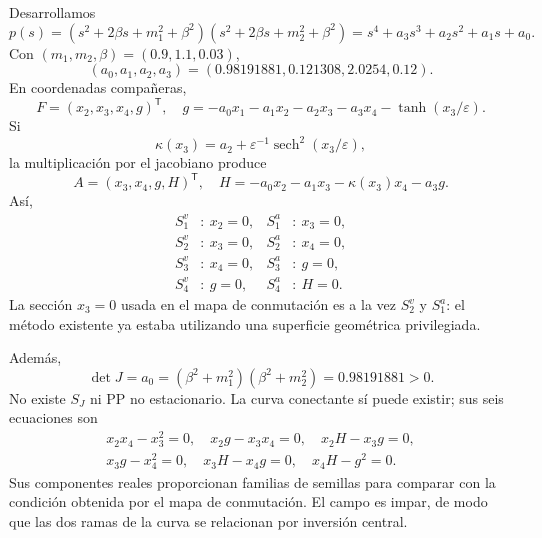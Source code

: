 Desarrollamos
\begin{equation}
 p(s)=(s^2+2\beta s+m_1^2+\beta^2)
       (s^2+2\beta s+m_2^2+\beta^2)
 =s^4+a_3s^3+a_2s^2+a_1s+a_0.
 \label{casegt:eq:kalman-poly}
\end{equation}
Con $(m_1,m_2,\beta)=(0.9,1.1,0.03)$,
\begin{equation}
 (a_0,a_1,a_2,a_3)
 =(0.98191881,0.121308,2.0254,0.12).
 \label{casegt:eq:kalman-coefficients}
\end{equation}
En coordenadas compañeras,
\begin{equation}
 F=(x_2,x_3,x_4,g)^{\mathsf T},
 \quad
 g=-a_0x_1-a_1x_2-a_2x_3-a_3x_4
 -\tanh(x_3/\varepsilon).
 \label{casegt:eq:kalman-field}
\end{equation}
Si
\begin{equation}
 \kappa(x_3)=a_2+\varepsilon^{-1}
 \operatorname{sech}^2(x_3/\varepsilon),
 \label{casegt:eq:kalman-kappa}
\end{equation}
la multiplicación por el jacobiano produce
\begin{equation}
 A=(x_3,x_4,g,H)^{\mathsf T},
 \quad
 H=-a_0x_2-a_1x_3-\kappa(x_3)x_4-a_3g.
 \label{casegt:eq:kalman-A}
\end{equation}
Así,
\begin{align}
 S_1^v&:\ x_2=0,& S_1^a&:\ x_3=0,\nonumber\\
 S_2^v&:\ x_3=0,& S_2^a&:\ x_4=0,\nonumber\\
 S_3^v&:\ x_4=0,& S_3^a&:\ g=0,\\
 S_4^v&:\ g=0,& S_4^a&:\ H=0.
 \label{casegt:eq:kalman-surfaces}
\end{align}
La sección $x_3=0$ usada en el mapa de conmutación es a la vez
$S_2^v$ y $S_1^a$: el método existente ya estaba utilizando una superficie
geométrica privilegiada.

Además,
\begin{equation}
 \det J=a_0=(\beta^2+m_1^2)(\beta^2+m_2^2)
 =0.98191881>0.
 \label{casegt:eq:kalman-det}
\end{equation}
No existe $S_J$ ni PP no estacionario. La curva conectante sí puede existir;
sus seis ecuaciones son
\begin{gather}
 x_2x_4-x_3^2=0,
 \quad x_2g-x_3x_4=0,
 \quad x_2H-x_3g=0,\nonumber\\
 x_3g-x_4^2=0,
 \quad x_3H-x_4g=0,
 \quad x_4H-g^2=0.
 \label{casegt:eq:kalman-CC}
\end{gather}
Sus componentes reales proporcionan familias de semillas para comparar con
la condición obtenida por el mapa de conmutación. El campo es impar, de modo
que las dos ramas de la curva se relacionan por inversión central.

